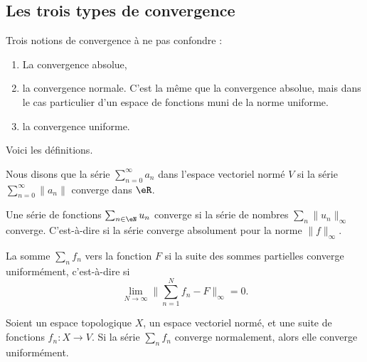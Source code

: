 \subsection{Les trois types de convergence}

Trois notions de convergence à ne pas confondre :
\begin{enumerate}
	\item
	      La convergence absolue,
	\item
	      la convergence normale. C'est la même que la convergence absolue, mais dans le cas particulier d'un espace de fonctions muni de la norme uniforme.
	\item
	      la convergence uniforme.
\end{enumerate}
Voici les définitions.

\begin{definition} \label{DefVFUIXwU}
	Nous disons que la série \( \sum_{n=0}^{\infty}a_n\) dans l'espace vectoriel normé \( V\)  si la série \( \sum_{n=0}^{\infty}\| a_n \|\) converge dans \( \eR\).
\end{definition}

\begin{definition} \label{DefVBrJUxo}
	Une série de fonctions \( \sum_{n\in \eN}u_n \) converge  si la série de nombres \( \sum_n\| u_n \|_{\infty}\) converge. C'est-à-dire si la série converge absolument pour la norme \( \| f \|_{\infty}\).
\end{definition}

\begin{definition}        \label{DEFooPABSooPMXMOV}
	La somme \( \sum_nf_n\)  vers la fonction \( F\) si la suite des sommes partielles converge uniformément, c'est-à-dire si
	\begin{equation}        \label{EqLNCJooVCTiIw}
		\lim_{N\to \infty} \| \sum_{n=1}^Nf_n-F \|_{\infty}=0.
	\end{equation}
\end{definition}

\begin{lemma}       \label{LEMooJZTBooIopLok}
    Soient un espace topologique \( X\), un espace vectoriel normé, et une suite de fonctions \( f_n\colon X\to V\). Si la série \( \sum_nf_n\) converge normalement, alors elle converge uniformément.
\end{lemma}

